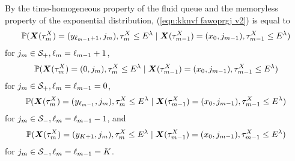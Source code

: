 By the time-homogeneous property of the fluid queue and the memoryless property of the exponential distribution, (\ref{eqn:kknvf fawoprgj v2}) is equal to 
\begin{align}
	\mathbb P(\boldsymbol X(\tau_m^X) =( y_{\ell_{m-1}+1},j_m), \tau_{m}^X\leq E^\lambda 
            	 \mid \boldsymbol X(\tau_{m-1}^X) = (x_0, j_{m-1}), \tau_{m-1}^X\leq E^\lambda )  \label{eqn: lim 1}
\end{align}
for \(j_m\in\mathcal{S}_+, \ell_m=\ell_{m-1}+1\), 
\begin{align}			
	 \mathbb P(\boldsymbol X(\tau_m^X) =( 0,j_m), \tau_{m}^X\leq E^\lambda 
            	 \mid \boldsymbol X(\tau_{m-1}^X) = (x_0, j_{m-1}), \tau_{m-1}^X\leq E^\lambda )
\end{align}
for \(j_m\in\mathcal{S}_+, \ell_m=\ell_{m-1}=0\), 
\begin{align}
	\mathbb P(\boldsymbol X(\tau_m^X) = (y_{\ell_{m-1}}, j_m), \tau_{m}^X\leq E^\lambda 
		\mid \boldsymbol X(\tau_{m-1}^X) = (x_0, j_{m-1}), \tau_{m-1}^X\leq E^\lambda ) 
\end{align}
for \(j_m\in\mathcal{S}_-, \ell_m=\ell_{m-1}-1\), and 
\begin{align}
	\mathbb P(\boldsymbol X(\tau_m^X) = (y_{K+1}, j_m), \tau_{m}^X\leq E^\lambda 
		\mid \boldsymbol X(\tau_{m-1}^X) = (x_0, j_{m-1}), \tau_{m-1}^X\leq E^\lambda )   \label{eqn: lim 4}
\end{align}
for \(j_m\in\mathcal{S}_-, \ell_m=\ell_{m-1}=K\).

